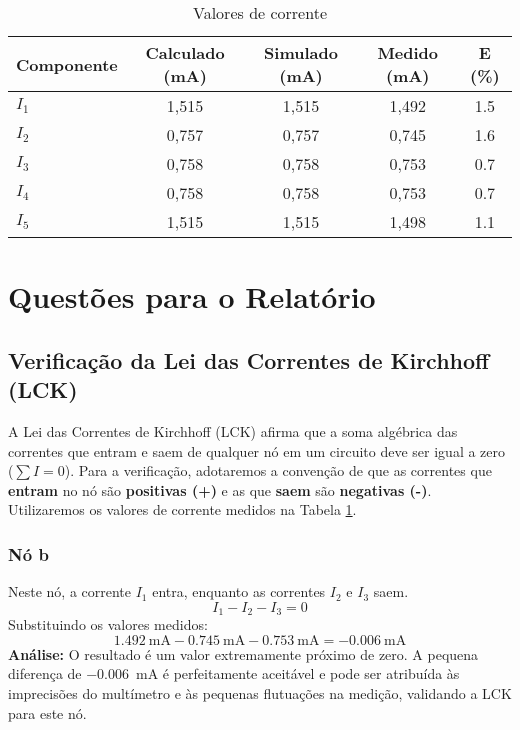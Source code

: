 \documentclass[a4paper, 12pt]{article}
\begin{document}
\begin{table}[H]
\centering
\caption{Valores de corrente}
\label{tab:correntes}
\begin{tabular}{|l|c|c|c|c|}
\hline
\textbf{Componente} & \textbf{Calculado (mA)} & \textbf{Simulado (mA)} & \textbf{Medido (mA)} & \textbf{E (\%)} \\
\hline
$I_1$ & 1,515 & 1,515 & 1,492 & 1.5 \\ \hline
$I_2$ & 0,757 & 0,757 & 0,745 & 1.6 \\ \hline
$I_3$ & 0,758 & 0,758 & 0,753 & 0.7 \\ \hline
$I_4$ & 0,758 & 0,758 & 0,753 & 0.7 \\ \hline
$I_5$ & 1,515 & 1,515 & 1,498 & 1.1 \\ \hline
\end{tabular}
\end{table}

\section{Questões para o Relatório}

\subsection{Verificação da Lei das Correntes de Kirchhoff (LCK)}

A Lei das Correntes de Kirchhoff (LCK) afirma que a soma algébrica das correntes que entram e saem de qualquer nó em um circuito deve ser igual a zero ($\sum I = 0$). Para a verificação, adotaremos a convenção de que as correntes que \textbf{entram} no nó são \textbf{positivas (+)} e as que \textbf{saem} são \textbf{negativas (-)}. Utilizaremos os valores de corrente medidos na Tabela \ref{tab:correntes}.

\subsubsection{Nó b}
Neste nó, a corrente $I_1$ entra, enquanto as correntes $I_2$ e $I_3$ saem.
\begin{equation*}
I_1 - I_2 - I_3 = 0
\end{equation*}
Substituindo os valores medidos:
\begin{equation*}
\SI{1.492}{\milli\ampere} - \SI{0.745}{\milli\ampere} - \SI{0.753}{\milli\ampere} = \SI{-0.006}{\milli\ampere}
\end{equation*}
\textbf{Análise:} O resultado é um valor extremamente próximo de zero. A pequena diferença de \SI{-0.006}{\milli\ampere} é perfeitamente aceitável e pode ser atribuída às imprecisões do multímetro e às pequenas flutuações na medição, validando a LCK para este nó.
\end{document}
